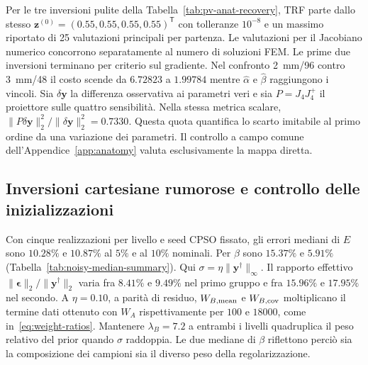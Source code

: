 Per le tre inversioni pulite della Tabella~\ref{tab:pv-anat-recovery}, TRF parte dallo stesso $\mathbf z^{(0)}=(0.55,0.55,0.55,0.55)^{\mathsf T}$ con tolleranze $10^{-8}$ e un massimo riportato di 25 valutazioni principali per partenza. Le valutazioni per il Jacobiano numerico concorrono separatamente al numero di soluzioni FEM. Le prime due inversioni terminano per criterio sul gradiente. Nel confronto 2~mm/96 contro 3~mm/48 il costo scende da $6.72823$ a $1.99784$ mentre $\widehat\alpha$ e $\widehat\beta$ raggiungono i vincoli. Sia $\delta\mathbf y$ la differenza osservativa ai parametri veri e sia $P=J_4J_4^+$ il proiettore sulle quattro sensibilità. Nella stessa metrica scalare, $\|P\delta\mathbf y\|_2^2/\|\delta\mathbf y\|_2^2=0.7330$. Questa quota quantifica lo scarto imitabile al primo ordine da una variazione dei parametri. Il controllo a campo comune dell'Appendice~\ref{app:anatomy} valuta esclusivamente la mappa diretta.

\subsection{Inversioni cartesiane rumorose e controllo delle inizializzazioni}

Con cinque realizzazioni per livello e seed CPSO fissato, gli errori mediani di $E$ sono $10.28\%$ e $10.87\%$ al $5\%$ e al $10\%$ nominali. Per $\beta$ sono $15.37\%$ e $5.91\%$ (Tabella~\ref{tab:noisy-median-summary}). Qui $\sigma=\eta\|\mathbf y^\dagger\|_\infty$. Il rapporto effettivo $\|\boldsymbol\epsilon\|_2/\|\mathbf y^\dagger\|_2$ varia fra $8.41\%$ e $9.49\%$ nel primo gruppo e fra $15.96\%$ e $17.95\%$ nel secondo. A $\eta=0.10$, a parità di residuo, $W_{B,\rm mean}$ e $W_{B,\rm cov}$ moltiplicano il termine dati ottenuto con $W_A$ rispettivamente per $100$ e $18000$, come in~\eqref{eq:weight-ratios}. Mantenere $\lambda_B=7.2$ a entrambi i livelli quadruplica il peso relativo del prior quando $\sigma$ raddoppia. Le due mediane di $\beta$ riflettono perciò sia la composizione dei campioni sia il diverso peso della regolarizzazione.

